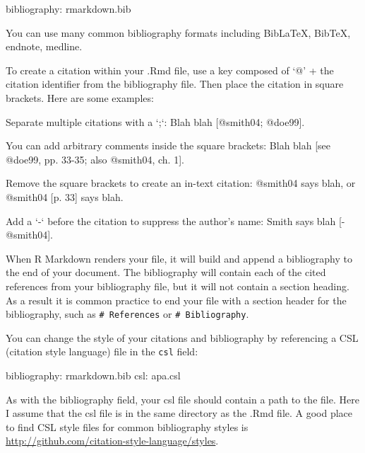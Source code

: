 \documentclass[]{book}
\newenvironment{Shaded}{\begin{snugshade}}{\end{snugshade}}
\newcommand{\BaseNTok}[1]{\textcolor[rgb]{0.00,0.00,0.81}{{#1}}}
\newcommand{\FunctionTok}[1]{\textcolor[rgb]{0.00,0.00,0.00}{{#1}}}
\newcommand{\NormalTok}[1]{{#1}}
\begin{document}
\begin{Shaded}
\begin{Highlighting}[]
\FunctionTok{bibliography:} \NormalTok{rmarkdown.bib}
\end{Highlighting}
\end{Shaded}

You can use many common bibliography formats including BibLaTeX, BibTeX,
endnote, medline.

To create a citation within your .Rmd file, use a key composed of `@' +
the citation identifier from the bibliography file. Then place the
citation in square brackets. Here are some examples:

\begin{Shaded}
\begin{Highlighting}[]
\NormalTok{Separate multiple citations with a }\BaseNTok{`;`}\NormalTok{: Blah blah [@smith04; @doe99].}

\NormalTok{You can add arbitrary comments inside the square brackets: }
\NormalTok{Blah blah [see @doe99, pp. 33-35; also @smith04, ch. 1].}

\NormalTok{Remove the square brackets to create an in-text citation: @smith04 }
\NormalTok{says blah, or @smith04 [p. 33] says blah.}

\NormalTok{Add a }\BaseNTok{`-`} \NormalTok{before the citation to suppress the author's name: }
\NormalTok{Smith says blah [-@smith04].}
\end{Highlighting}
\end{Shaded}

When R Markdown renders your file, it will build and append a
bibliography to the end of your document. The bibliography will contain
each of the cited references from your bibliography file, but it will
not contain a section heading. As a result it is common practice to end
your file with a section header for the bibliography, such as
\texttt{\#\ References} or \texttt{\#\ Bibliography}.

You can change the style of your citations and bibliography by
referencing a CSL (citation style language) file in the \texttt{csl}
field:

\begin{Shaded}
\begin{Highlighting}[]
\FunctionTok{bibliography:} \NormalTok{rmarkdown.bib}
\FunctionTok{csl:} \NormalTok{apa.csl}
\end{Highlighting}
\end{Shaded}

As with the bibliography field, your csl file should contain a path to
the file. Here I assume that the csl file is in the same directory as
the .Rmd file. A good place to find CSL style files for common
bibliography styles is
\url{http://github.com/citation-style-language/styles}.
\end{document}
